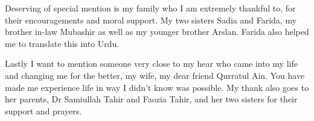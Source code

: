 Deserving of special mention is my family  who I am extremely thankful to, for their encouragements and moral support. My two sisters Sadia and Farida, my brother in-law Mubashir as well as my younger brother Arslan. Farida also helped me to translate this into Urdu.

Lastly I want to mention someone very close to my hear who came into my life and changing me for the better, my wife, my dear friend Qurratul Ain. You have made me experience life in way I didn't know was possible. My thank also goes to her parents, Dr Samiullah Tahir and Faozia Tahir, and her two sisters for their support and prayers.
